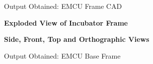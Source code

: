 \documentclass{beamer}
\begin{document}
\begin{frame} {Output Obtained: EMCU Frame CAD}
\begin{center}
        \vspace{0.25cm}

        \begin{minipage} {0.49\textwidth}
            \centering
            \textbf{Exploded View of Incubator Frame}
        \end{minipage}
        \hfill
        \begin{minipage} {0.45\textwidth}
            \centering
            \textbf{Side, Front, Top and Orthographic Views}
        \end{minipage}
    \end{center}
\end{frame}

\begin{frame} {Output Obtained: EMCU Base Frame}




\end{frame}
\end{document}
